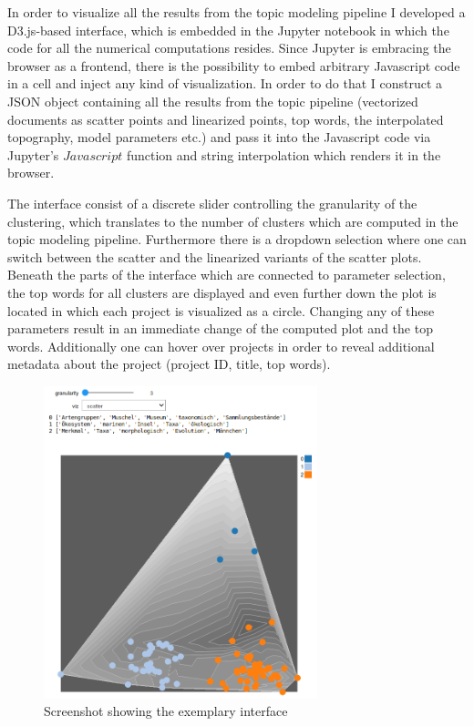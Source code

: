 In order to visualize all the results from the topic modeling pipeline I developed a D3.js-based interface, which is embedded in the Jupyter notebook in which the code for all the numerical computations resides. Since Jupyter is embracing the browser as a frontend, there is the possibility to embed arbitrary Javascript code in a cell and inject any kind of visualization. In order to do that I construct a JSON object containing all the results from the topic pipeline (vectorized documents as scatter points and linearized points, top words, the interpolated topography, model parameters etc.) and pass it into the Javascript code via Jupyter's $Javascript$ function and string interpolation which renders it in the browser.

The interface consist of a discrete slider controlling the granularity of the clustering, which translates to the number of clusters which are computed in the topic modeling pipeline. Furthermore there is a dropdown selection where one can switch between the scatter and the linearized variants of the scatter plots.
Beneath the parts of the interface which are connected to parameter selection, the top words for all clusters are displayed and even further down the plot is located in which each project is visualized as a circle. Changing any of these parameters result in an immediate change of the computed plot and the top words. Additionally one can hover over projects in order to reveal additional metadata about the project (project ID, title, top words).

\begin{figure}[t]
	\centering
	\includegraphics[width=300px]{../chapters/implementation/pics/interface}
	\caption{\label{pic:interface} Screenshot showing the exemplary interface}
\end{figure}

